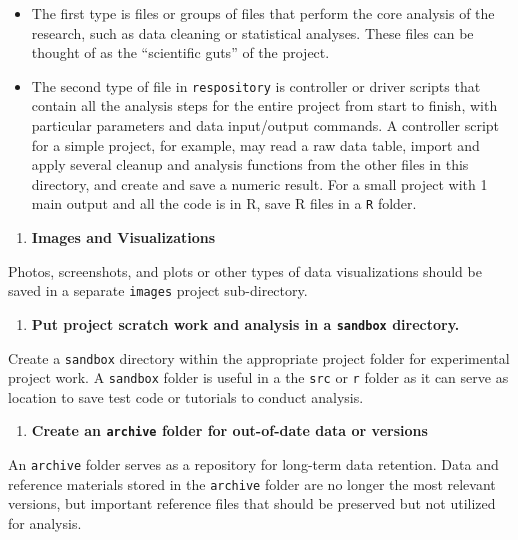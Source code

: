 \documentclass[
]{book}
\providecommand{\tightlist}{%
  \setlength{\itemsep}{0pt}\setlength{\parskip}{0pt}}
\begin{document}
\begin{itemize}
\tightlist
\item
  The first type is files or groups of files that perform the core analysis of the research, such as data cleaning or statistical analyses. These files can be thought of as the ``scientific guts'' of the project.
\item
  The second type of file in \texttt{respository} is controller or driver scripts that contain all the analysis steps for the entire project from start to finish, with particular parameters and data input/output commands. A controller script for a simple project, for example, may read a raw data table, import and apply several cleanup and analysis functions from the other files in this directory, and create and save a numeric result. For a small project with 1 main output and all the code is in R, save R files in a \texttt{R} folder.
\end{itemize}

\begin{enumerate}
\def\labelenumi{\arabic{enumi}.}
\setcounter{enumi}{4}
\tightlist
\item
  \textbf{Images and Visualizations}
\end{enumerate}

Photos, screenshots, and plots or other types of data visualizations should be saved in a separate \texttt{images} project sub-directory.

\begin{enumerate}
\def\labelenumi{\arabic{enumi}.}
\setcounter{enumi}{5}
\tightlist
\item
  \textbf{Put project scratch work and analysis in a \texttt{sandbox} directory.}
\end{enumerate}

Create a \texttt{sandbox} directory within the appropriate project folder for experimental project work. A \texttt{sandbox} folder is useful in a the \texttt{src} or \texttt{r} folder as it can serve as location to save test code or tutorials to conduct analysis.

\begin{enumerate}
\def\labelenumi{\arabic{enumi}.}
\setcounter{enumi}{6}
\tightlist
\item
  \textbf{Create an \texttt{archive} folder for out-of-date data or versions}
\end{enumerate}

An \texttt{archive} folder serves as a repository for long-term data retention. Data and reference materials stored in the \texttt{archive} folder are no longer the most relevant versions, but important reference files that should be preserved but not utilized for analysis.
\end{document}
